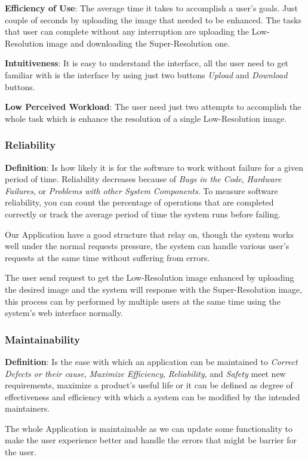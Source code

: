 \documentclass[12pt]{article}
\begin{document}
				\textbf{Efficiency of Use}: The average time it takes to accomplish a user's goals. Just couple of seconds by uploading the image that needed to be enhanced. The tasks that user can complete without any interruption are uploading the Low-Resolution image and downloading the Super-Resolution one.
				
				\textbf{Intuitiveness}: It is easy to understand the interface, all the user need to get familiar with is the interface by using just two buttons \textit{Upload} and \textit{Download} buttons.
				
				\textbf{Low Perceived Workload}: The user need just two attempts to accomplish the whole task which is enhance the resolution of a single Low-Resolution image.
			\subsubsection{Reliability}
				\textbf{Definition}: Is how likely it is for the software to work without failure for a given period of time. Reliability decreases because of \textit{Bugs in the Code}, \textit{Hardware Failures}, or \textit{Problems with other System Components}. To measure software reliability, you can count the percentage of operations that are completed correctly or track the average period of time the system runs before failing.
				
				Our Application have a good structure that relay on, though the system works well under the normal requests pressure, the system can handle various user's requests at the same time without suffering from errors.
				
				The user send request to get the Low-Resolution image enhanced by uploading the desired image and the system will response with the Super-Resolution image, this process can by performed by multiple users at the same time using the system's web interface normally.
			\subsubsection{Maintainability}
				\textbf{Definition}: Is the ease with which an application can be maintained to \textit{Correct Defects or their cause}, \textit{Maximize Efficiency}, \textit{Reliability}, and \textit{Safety} meet new requirements, maximize a product's useful life or it can be defined as degree of effectiveness and efficiency with which a system can be modified by the intended maintainers.
				
				The whole Application is maintainable as we can update some functionality to make the user experience better and handle the errors that might be barrier for the user.
\end{document}
